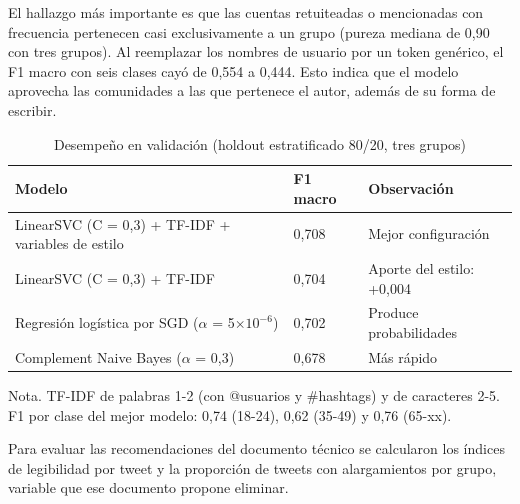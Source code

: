 \documentclass[10pt,twocolumn]{article}
\begin{document}
El hallazgo más importante es que las cuentas retuiteadas o mencionadas con frecuencia pertenecen casi exclusivamente a un grupo (pureza mediana de 0,90 con tres grupos). Al reemplazar los nombres de usuario por un token genérico, el F1 macro con seis clases cayó de 0,554 a 0,444. Esto indica que el modelo aprovecha las comunidades a las que pertenece el autor, además de su forma de escribir.

\begin{table}[!t]
\centering\footnotesize
\caption{Desempeño en validación (holdout estratificado 80/20, tres grupos)}\label{tab:3}
\renewcommand{\arraystretch}{1.15}
\begin{tabular}{p{}p{}p{}}
\hline
\raggedright\textbf{Modelo} & \raggedright\textbf{F1 macro} & \raggedright\textbf{Observación} \tabularnewline \hline
\raggedright LinearSVC (C = 0,3) + TF-IDF + variables de estilo & \raggedright 0,708 & \raggedright Mejor configuración \tabularnewline
\raggedright LinearSVC (C = 0,3) + TF-IDF & \raggedright 0,704 & \raggedright Aporte del estilo: +0,004 \tabularnewline
\raggedright Regresión logística por SGD ($\alpha$ = 5$\times$$10^{-6}$) & \raggedright 0,702 & \raggedright Produce probabilidades \tabularnewline
\raggedright Complement Naive Bayes ($\alpha$ = 0,3) & \raggedright 0,678 & \raggedright Más rápido \tabularnewline
\hline
\end{tabular}
\par\smallskip\raggedright\scriptsize Nota. TF-IDF de palabras 1-2 (con @usuarios y \#hashtags) y de caracteres 2-5. F1 por clase del mejor modelo: 0,74 (18-24), 0,62 (35-49) y 0,76 (65-xx).
\end{table}

Para evaluar las recomendaciones del documento técnico se calcularon los índices de legibilidad por tweet y la proporción de tweets con alargamientos por grupo, variable que ese documento propone eliminar.
\end{document}
